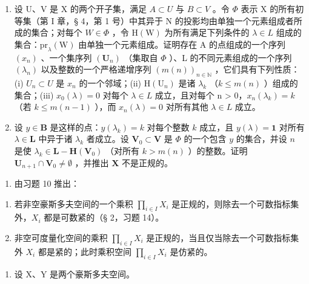 \begin{enumerate}
\def\labelenumi{\alph{enumi})}
\setcounter{enumi}{1}
\item
  设 U、V 是 X 的两个开子集，满足 \(A \subset U\) 与 \(B \subset V\) 。令 \(\Phi\) 表示 X 的所有初等集（第 I 章，§ 4，第 1 号）中其异于 N 的投影均由单独一个元素组成者所成的集合；对每个 \(W \in \Phi\) ，令 \(\mathrm{H}(\mathrm{W})\) 为所有满足下列条件的 \(\lambda \in L\) 组成的集合：\(\mathrm{pr}_{\lambda}(\mathrm{W})\) 由单独一个元素组成。证明存在 A 的点组成的一个序列 \((x_{n})\) 、一个集序列 \((\mathbf{U}_{n})\) （集取自 \(\Phi\) ）、L 的不同元素组成的一个序列 \((\lambda_{n})\) 以及整数的一个严格递增序列 \((m(n))_{n \in \mathbb{N}}\) ，它们具有下列性质：(i) \(U_{n} \subset U\) 是 \(x_{n}\) 的一个邻域；(ii) \(\mathrm{H}(\mathrm{U}_{n})\) 是诸 \(\lambda_{k}\) （\(k \leqslant m(n)\) ）组成的集合；(iii) \(x_{0}(\lambda) = 0\) 对每个 \(\lambda \in L\) 成立，且对每个 n \textgreater{} 0，\(x_{n}(\lambda_{k}) = k\) （若 \(k \leqslant m(n - 1)\) ），而 \(x_{n}(\lambda) = 0\) 对所有其他 \(\lambda \in L\) 成立。
\item
  设 \(y \in \mathbf{B}\) 是这样的点：\(y(\lambda_k) = k\) 对每个整数 \(k\) 成立，且 \(y(\lambda) = \mathbf{1}\) 对所有 \(\lambda \in \mathbf{L}\) 中异于诸 \(\lambda_k\) 者成立。设 \(\mathbf{V}_0 \subset \mathbf{V}\) 是 \(\Phi\) 的一个包含 \(y\) 的集合，并设 \(n\) 是使 \(\lambda_k \in \mathbf{L} - \mathbf{H}(\mathbf{V}_0)\) （对所有 \(k > m(n)\) ）的整数。证明 \(\mathbf{U}_{n+1} \cap \mathbf{V}_0 \neq \emptyset\) ，并推出 \(\mathbf{X}\) 不是正规的。
\end{enumerate}

\begin{enumerate}
\def\labelenumi{\arabic{enumi})}
\setcounter{enumi}{10}
\tightlist
\item
  由习题 10 推出：
\end{enumerate}

\begin{enumerate}
\def\labelenumi{\alph{enumi})}
\item
  若非空豪斯多夫空间的一个乘积 \(\prod_{i\in I}X_i\) 是正规的，则除去一个可数指标集外，\(X_i\) 都是可数紧的（§ 2，习题 14）。
\item
  非空可度量化空间的乘积 \(\prod_{i\in I}X_i\) 是正规的，当且仅当除去一个可数指标集外 \(X_{i}\) 都是紧的；此时乘积空间 \(\prod_{i\in I}X_{i}\) 是仿紧的。
\end{enumerate}

\begin{enumerate}
\def\labelenumi{\arabic{enumi})}
\setcounter{enumi}{11}
\tightlist
\item
  设 X、Y 是两个豪斯多夫空间。
\end{enumerate}

